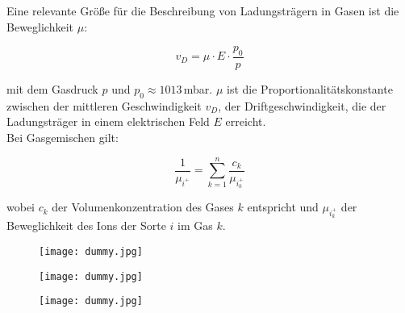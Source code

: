 Eine relevante Größe für die Beschreibung von Ladungsträgern in Gasen ist die Beweglichkeit $\mu$:

\[v_D = \mu\cdot E \cdot \frac{p_0}{p}  \]

mit dem Gasdruck $p$ und $p_0\approx 1013\,$mbar. $\mu$ ist die Proportionalitätskonstante zwischen
der mittleren Geschwindigkeit $v_D$, der Driftgeschwindigkeit, die der Ladungsträger in einem
elektrischen Feld $E$ erreicht.
\\
Bei Gasgemischen gilt:

\[\frac{1}{\mu_{i^+}} = \sum_{k=1}^n \frac{c_k}{\mu_{i^+_k}}  \]

wobei $c_k$ der Volumenkonzentration des Gases $k$ entspricht und $\mu_{i^+_k}$ der Beweglichkeit
des Ions der Sorte $i$ im Gas $k$.

\begin{figure}[H]
	\centering
	\texttt{[image: dummy.jpg]}
\end{figure}

\begin{figure}[H]
	\centering
	\texttt{[image: dummy.jpg]}
\end{figure}

\begin{figure}[H]
	\centering
	\texttt{[image: dummy.jpg]}
\end{figure}

